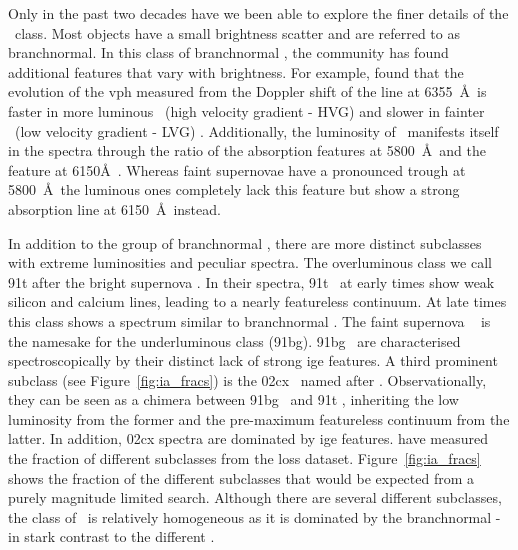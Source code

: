 Only in the past two decades have we been able to explore the finer details of the \sneia\ class. Most objects have a small brightness scatter and are referred to as \gls{branchnormal}. In this class of \gls{branchnormal} \sneia, the community has found additional features that vary with brightness. For example, \citet{2005ApJ...623.1011B} found that the evolution of the \gls{vph} measured from the Doppler shift of the  line at 6355~\AA\ is faster in more luminous \sneia\ (high velocity gradient - HVG) and slower in fainter \sneia\ (low velocity gradient - LVG) . Additionally, the luminosity of \sneia\ manifests itself in the spectra through the ratio of the  absorption features at 5800~\AA\ and the feature at 6150\AA\ \citep{1995ApJ...455L.147N}. Whereas faint supernovae have a pronounced trough at 5800~\AA\ the luminous ones completely lack this feature but show a strong absorption line at 6150~\AA\ instead.  

In addition to the group of \gls{branchnormal} \sneia, there are more distinct subclasses with extreme luminosities and peculiar spectra. The overluminous class we call \gls{91t} after the bright supernova  \citep{1992AJ....103.1632P}. In their spectra, \gls{91t} \sneia\ at early times show weak silicon and calcium lines, leading to a nearly featureless continuum. At late times this class shows a spectrum similar to \gls{branchnormal} \sneia. The faint supernova \ \citep{1992AJ....104.1543F} is the namesake for the underluminous class (\gls{91bg}).  \gls{91bg} \sneia\ are characterised spectroscopically by their distinct lack of strong \gls{ige} features. A third prominent subclass (see Figure~\ref{fig:ia_fracs}) is the \gls{02cx} \sneia\ named after . Observationally, they can be seen as a chimera between \gls{91bg} \sneia\ and \gls{91t} \sneia, inheriting the low luminosity from the former and the pre-maximum featureless continuum from the latter. In addition, \gls{02cx} spectra are dominated by \gls{ige} features. \citet{2011MNRAS.412.1441L} have measured the fraction of different subclasses from the \gls{loss} dataset. Figure~\ref{fig:ia_fracs} shows the fraction of the different subclasses that would be expected from a purely magnitude limited search. Although there are several different subclasses, the class of \sneia\ is relatively homogeneous as it is dominated by the \gls{branchnormal} \sneia - in stark contrast to the different \sneii.


